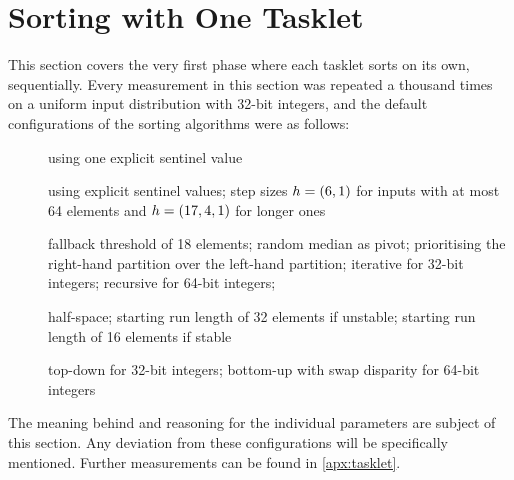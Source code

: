 \chapter{Sorting with One Tasklet}
\label{sec:tasklet}

This section covers the very first phase where each tasklet sorts on its own, \ie{} sequentially.
Every measurement in this section was repeated a thousand times on a uniform input distribution with 32-bit integers, and the default configurations of the sorting algorithms were as follows:
\begin{description}
	\item[\IS{}]
	using one explicit sentinel value

	\item[\ShS{}]
	using explicit sentinel values;
	step sizes \(h = (6, 1)\) for inputs with at most 64 elements and \(h = (17, 4, 1)\) for longer ones

	\item[\QS{}]
	fallback threshold of 18 elements;
	random median as pivot;
	prioritising the right-hand partition over the left-hand partition;
	iterative for 32-bit integers;
	recursive for 64-bit integers;

	\item[\MS{}]
	half-space;
	starting run length of 32 elements if unstable;
	starting run length of 16 elements if stable

	\item[\HS{}]
	top-down for 32-bit integers;
	bottom-up with swap disparity for 64-bit integers
\end{description}
The meaning behind and reasoning for the individual parameters are subject of this section.
Any deviation from these configurations will be specifically mentioned.
Further measurements can be found in \cref{apx:tasklet}.

\clearpage


\clearpage


\clearpage


\clearpage


\clearpage


\clearpage

